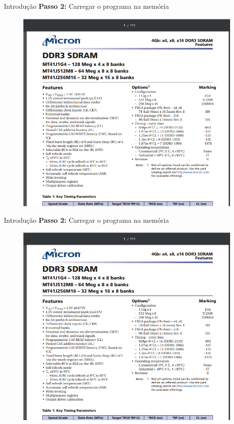 \documentclass{beamer}
\begin{document}
\begin{frame}{Introdução}
	\textbf{Passo 2:} Carregar o programa na memória
	\begin{figure}
		\includegraphics[width=0.6\paperwidth]{resources/ram}
	\end{figure}
\end{frame}
\begin{frame}{Introdução}
	\textbf{Passo 2:} Carregar o programa na memória
	\begin{figure}
		\includegraphics[width=0.6\paperwidth]{resources/ram}
	\end{figure}
\end{frame}
\end{document}
